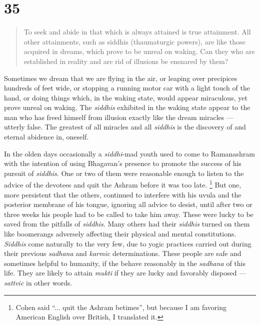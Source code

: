 \documentclass[12pt]{report}
\begin{document}
\section{35}

\begin{quote}
  To seek and abide in that which is always attained is true
  attainment. All other attainments, such as siddhis (thaumaturgic
  powers), are like those acquired in dreams, which prove to be unreal
  on waking. Can they who are established in reality and are rid of
  illusions be ensnared by them?
\end{quote}


Sometimes we dream that we are flying in the air, or leaping over
precipices hundreds of feet wide, or stopping a running motor car with
a light touch of the hand, or doing things which, in the waking state,
would appear miraculous, yet prove unreal on waking. The
\emph{siddhis} exhibited in the waking state appear to the man who has
freed himself from illusion exactly like the dream miracles ---
utterly false. The greatest of all miracles and all \emph{siddhis} is
the discovery of and eternal abidence in, oneself.

In the olden days occasionally a \emph{siddhi}-mad youth used to come
to Ramanashram with the intention of using Bhagavan's presence to
promote the success of his pursuit of \emph{siddhis}. One or two of
them were reasonable enough to listen to the advice of the devotees
and quit the Ashram before it was too late. \footnote{Cohen said
  ``... quit the Ashram betimes'', but because I am favoring American
  English over British, I translated it.} But one, more persistent
that the others, continued to interfere with his uvula and the
posterior membrane of his tongue, ignoring all advice to desist, until
after two or three weeks his people had to be called to take him
away. These were lucky to be saved from the pitfalls of
\emph{siddhis}. Many others had their \emph{siddhis} turned on them
like boomerangs adversely affecting their physical and mental
constitutions. \emph{Siddhis} come naturally to the very few, due to
yogic practices carried out during their previous \emph{sadhana} and
\emph{karmic} determinations. These people are safe and sometimes
helpful to humanity, if the behave reasonably in the \emph{sadhana} of
this life. They are likely to attain \emph{mukti} if they are lucky
and favorably disposed --- \emph{sattvic} in other words.
\end{document}
